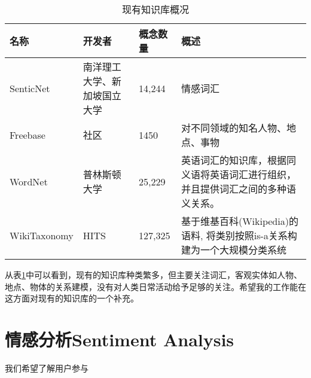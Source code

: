 \begin{table}[!h]
\begin{tabular}[0.7\textwidth]{|l|p{2cm}|l|p{4cm}|}
\hline
名称 & 开发者 & 概念数量  & 概述 \\
\hline
SenticNet & 南洋理工大学、新加坡国立大学 & 14,244	& 情感词汇  \\
\hline
Freebase & 社区	& 1450	& 对不同领域的知名人物、地点、事物 \\
\hline
WordNet\cite{miller1995wordnet} & 普林斯顿大学 & 25,229 & 英语词汇的知识库，根据同义语将英语词汇进行组织，并且提供词汇之间的多种语义关系。 \\
\hline
WikiTaxonomy\cite{ponzetto2007deriving}	& HITS & 127,325 & 基于维基百科(Wikipedia)的语料, 将类别按照is-a关系构建为一个大规模分类系统 \\
\hline
\end{tabular}
\caption{现有知识库概况}
\label{table:knowledge_base}
\end{table}

从表\ref{table:knowledge_base}中可以看到，现有的知识库种类繁多，但主要关注词汇，客观实体如人物、地点、物体的关系建模，没有对人类日常活动给予足够的关注。希望我的工作能在这方面对现有的知识库的一个补充。

\section{情感分析Sentiment Analysis}
我们希望了解用户参与
